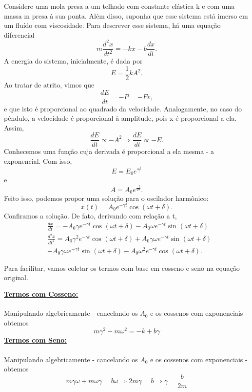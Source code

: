 \documentclass{article}
\begin{document}
  Considere uma mola presa a um telhado com constante elástica k e com uma massa m presa à sua ponta. Além disso, suponha que
esse sistema está imerso em um fluído com viscosidade. Para descrever esse sistema, há uma equação diferencial 
  \[
    m \frac{d^{2}x}{dt^{2}} = -kx - b \frac{dx}{dt}.
  \]
A energia do sistema, inicialmente, é dada por 
  \[
    E = \frac{1}{2}kA^{2}.
  \]
  Ao tratar de atrito, vimos que 
  \[
   \frac{dE}{dt} = - P = - Fv, 
  \]
e que isto é proporcional ao quadrado da velocidade. Analogamente, no caso do pêndulo, a velocidade é proporcional à amplitude, pois x 
é proporcional a ela. Assim, 
  \[
    \frac{dE}{dt}\propto -A^{2} \Rightarrow \frac{dE}{dt}\propto -E.
  \]
  Conhecemos uma função cuja derivada é proporcional a ela mesma - a exponencial. Com isso,  
  \[
    E = E_{0} e^{\frac{-t}{\tau }}
  \]
e 
  \[
   A = A_{0} e^{\frac{-t}{2\tau }}.
  \]
  Feito isso, podemos propor uma solução para o oscilador harmônico:
  \[
    x(t) = A_{0}e^{-\gamma t}\cos^{}{(\omega t + \delta )}.
  \]
  Confiramos a solução. De fato, derivando com relação a t,
 \begin{align*}
   &\frac{dx}{dt} = -A_{0}\gamma e^{-\gamma t}\cos^{}{(\omega t + \delta )}-A_{0}\omega e^{-\gamma t}\sin^{}{(\omega t + \delta )}\\
   &\frac{d^{2}x}{dt^{2}} = A_{0}\gamma ^{2}e^{-\gamma t}\cos^{}{(\omega t + \delta )} + A_{0}\gamma \omega e^{-\gamma t}\sin^{}{(\omega t + \delta )}\\
   &+A_{0}\gamma\omega e^{-\gamma t}\sin^{}{(\omega t+\delta )}-A_{0}\omega ^{2}e^{-\gamma t}\cos^{}{(\omega t + \delta )}.
 \end{align*}

Para facilitar, vamos coletar os termos com base em cosseno e seno na equação original.

\textbf{\underline{Termos com Cosseno:}}
\paragraph{}  Manipulando algebricamente - cancelando os \(A_{0}\) e os cossenos com exponenciais - obtemos 
  \[
    m\gamma ^{2} - m\omega^{2} = -k + b\gamma 
  \]
\newpage
\textbf{\underline{Termos com Seno:}}
\paragraph{}  Manipulando algebricamente - cancelando os \(A_{0}\) e os cossenos com exponenciais - obtemos 
  \[
    m\gamma \omega  + m\omega \gamma  = b\omega \Rightarrow 2m\gamma  = b \Rightarrow \gamma = \frac{b}{2m}
  \]
\end{document}

